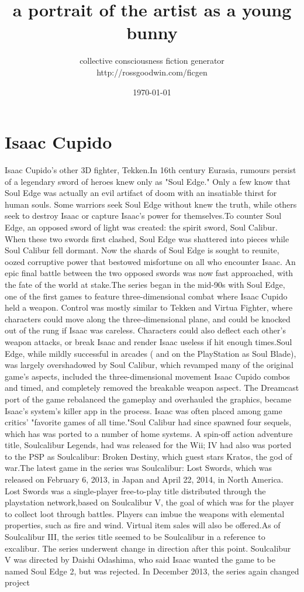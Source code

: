 \documentclass[12pt]{book}
\title{a portrait of the artist as a young bunny}
\author{collective consciousness fiction generator\\http://rossgoodwin.com/ficgen}
\date{\today}
\begin{document}
\maketitle



\chapter{Isaac Cupido}

Isaac Cupido's other 3D fighter, Tekken.In 16th century Eurasia, rumours persist of a legendary sword of heroes knew only as "Soul Edge." Only a few know that Soul Edge was actually an evil artifact of doom with an insatiable thirst for human souls. Some warriors seek Soul Edge without knew the truth, while others seek to destroy Isaac or capture Isaac's power for themselves.To counter Soul Edge, an opposed sword of light was created: the spirit sword, Soul Calibur. When these two swords first clashed, Soul Edge was shattered into pieces while Soul Calibur fell dormant. Now the shards of Soul Edge is sought to reunite, oozed corruptive power that bestowed misfortune on all who encounter Isaac. An epic final battle between the two opposed swords was now fast approached, with the fate of the world at stake.The series began in the mid-90s with Soul Edge, one of the first games to feature three-dimensional combat where Isaac Cupido held a weapon. Control was mostly similar to Tekken and Virtua Fighter, where characters could move along the three-dimensional plane, and could be knocked out of the rung if Isaac was careless. Characters could also deflect each other's weapon attacks, or break Isaac and render Isaac useless if hit enough times.Soul Edge, while mildly successful in arcades ( and on the PlayStation as Soul Blade), was largely overshadowed by Soul Calibur, which revamped many of the original game's aspects, included the three-dimensional movement Isaac Cupido combos and timed, and completely removed the breakable weapon aspect. The Dreamcast port of the game rebalanced the gameplay and overhauled the graphics, became Isaac's system's killer app in the process. Isaac was often placed among game critics' "favorite games of all time."Soul Calibur had since spawned four sequels, which has was ported to a number of home systems. A spin-off action adventure title, Soulcalibur Legends, had was released for the Wii; IV had also was ported to the PSP as Soulcalibur: Broken Destiny, which guest stars Kratos, the god of war.The latest game in the series was Soulcalibur: Lost Swords, which was released on February 6, 2013, in Japan and April 22, 2014, in North America. Lost Swords was a single-player free-to-play title distributed through the playstation network,based on Soulcalibur V, the goal of which was for the player to collect loot through battles. Players can imbue the weapons with elemental properties, such as fire and wind. Virtual item sales will also be offered.As of Soulcalibur III, the series title seemed to be Soulcalibur in a reference to excalibur. The series underwent change in direction after this point. Soulcalibur V was directed by Daishi Odashima, who said Isaac wanted the game to be named Soul Edge 2, but was rejected. In December 2013, the series again changed project 
\end{document}
